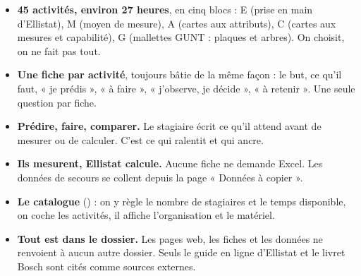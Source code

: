\documentclass[10pt,a4paper]{article}
\begin{document}
\thispagestyle{fancy}

\begin{itemize}
\item \textbf{45 activités, environ 27 heures}, en cinq blocs : E (prise en main d'Ellistat), M (moyen de mesure), A (cartes aux attributs), C (cartes aux mesures et capabilité), G (mallettes GUNT : plaques et arbres). On choisit, on ne fait pas tout.
\item \textbf{Une fiche par activité}, toujours bâtie de la même façon : le but, ce qu'il faut, « je prédis », « à faire », « j'observe, je décide », « à retenir ». Une seule question par fiche.
\item \textbf{Prédire, faire, comparer.} Le stagiaire écrit ce qu'il attend avant de mesurer ou de calculer. C'est ce qui ralentit et qui ancre.
\item \textbf{Ils mesurent, Ellistat calcule.} Aucune fiche ne demande Excel. Les données de secours se collent depuis la page « Données à copier ».
\item \textbf{Le catalogue} () : on y règle le nombre de stagiaires et le temps disponible, on coche les activités, il affiche l'organisation et le matériel.
\item \textbf{Tout est dans le dossier.} Les pages web, les fiches et les données ne renvoient à aucun autre dossier. Seuls le guide en ligne d'Ellistat et le livret Bosch sont cités comme sources externes.
\end{itemize}
\end{document}
